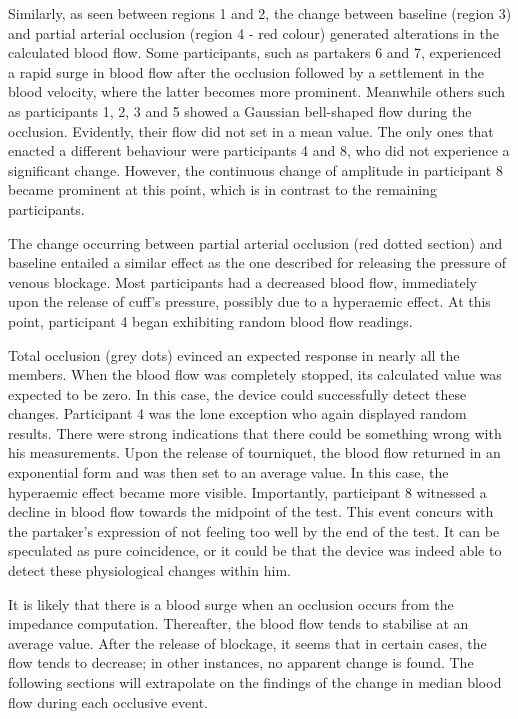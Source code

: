 Similarly, as seen between regions 1 and 2, the change between baseline (region 3) and partial arterial occlusion (region 4 - red colour) generated alterations in the calculated blood flow. Some participants, such as partakers 6 and 7, experienced a rapid surge in blood flow after the occlusion followed by a settlement in the blood velocity, where the latter becomes more prominent. Meanwhile others such as participants 1, 2, 3 and 5 showed a Gaussian bell-shaped flow during the occlusion. Evidently, their flow did not set in a mean value. The only ones that enacted a different behaviour were participants 4 and 8, who did not experience a significant change. However, the continuous change of amplitude in participant 8 became prominent at this point, which is in contrast to the remaining participants.

The change occurring between partial arterial occlusion (red dotted section) and baseline entailed a similar effect as the one described for releasing the pressure of venous blockage. Most participants had a decreased blood flow, immediately upon the release of cuff's pressure, possibly due to a hyperaemic effect. At this point, participant 4 began exhibiting random blood flow readings.

Total occlusion (grey dots) evinced an expected response in nearly all the members. When the blood flow was completely stopped, its calculated value was expected to be zero. In this case, the device could successfully detect these changes. Participant 4 was the lone exception who again displayed random results. There were strong indications that there could be something wrong with his measurements. Upon the release of tourniquet, the blood flow returned in an exponential form and was then set to an average value. In this case, the hyperaemic effect became more visible. Importantly, participant 8 witnessed a decline in blood flow towards the midpoint of the test. This event concurs with the partaker's expression of not feeling too well by the end of the test. It can be speculated as pure coincidence, or it could be that the device was indeed able to detect these physiological changes within him.

It is likely that there is a blood surge when an occlusion occurs from the impedance computation. Thereafter, the blood flow tends to stabilise at an average value. After the release of blockage, it seems that in certain cases, the flow tends to decrease; in other instances, no apparent change is found. The following sections will extrapolate on the findings of the change in median blood flow during each occlusive event.

